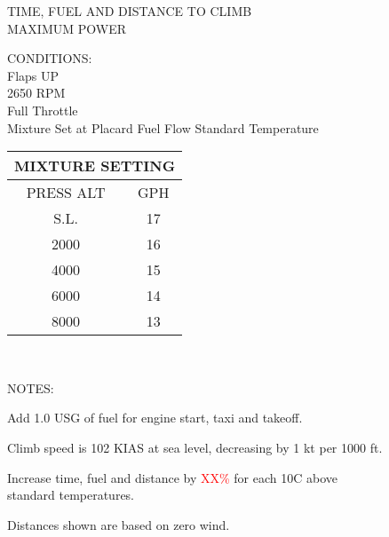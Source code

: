 \begin{figure}[t]
\begin{center}
\begin{perfhdr}TIME, FUEL AND DISTANCE TO CLIMB\\
MAXIMUM POWER\\
\end{perfhdr}
\Large
\begin{minipage}{4in}
  \begin{flushleft}
    CONDITIONS:\\
    Flaps UP\\
    2650 RPM\\
    Full Throttle\\
    Mixture Set at Placard Fuel Flow
    Standard Temperature\\

    \end{flushleft}
\end{minipage}
\hfill
\begin{minipage}{1.5in}
  \begin{tabular}{|c|c|}
    \hline
    \multicolumn{2}{|c|}{MIXTURE SETTING}\\
    \hline
    PRESS ALT&GPH\\
    \hline
    S.L.&17\\
    2000&16\\
    4000&15\\
    6000&14\\
    8000&13\\
    \hline
    \end{tabular}
  \end{minipage}
\\
\vspace{\perfnoteskip}
    \raggedright NOTES:
    \begin{enumerate*}
      \item Add 1.0 USG of fuel for engine start, taxi and takeoff.
      \item Climb speed is 102 KIAS at sea level, decreasing by 1 kt per 1000 ft.
      \item Increase time, fuel and distance by \textcolor{red}{XX\%} for each 10\textdegree C above standard
      temperatures.
      \item Distances shown are based on zero wind.
      \end{enumerate*}


\end{center}
\end{figure}
